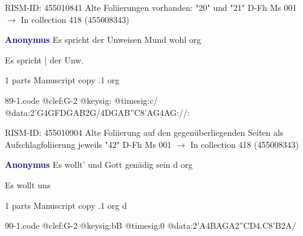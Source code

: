 \documentclass[twocolumn]{book}
\begin{document}
\newline RISM-ID: 455010841
\newline Alte Foliierungen vorhanden: "20" und "21"
\newline D-Fh  Ms 001
\newline $\rightarrow$ In collection 418 (455008343)

\newline \par \vspace{7pt} \textcolor{darkblue}{\textbf{Anonymus  }}
\newline Es spricht der Unweisen Mund wohl    
\newline org
\newline \begin{itshape}[f.43r, at left:] Es spricht | der Unw.\end{itshape} 
\newline \textcolor{darkblue}{}  1 parts  
\newline Manuscript copy
.1  org  
\begin{filecontents*}{89-1.code}
@clef:G-2
@keysig:
@timesig:c/
@data:2'G4GFDGAB2G/4DGAB''C{8'AG}4AG://:
\end{filecontents*}
\newline
%

\newline RISM-ID: 455010904
\newline Alte Foliierung auf den gegenüberliegenden Seiten als Aufschlagfoliierung jeweils "42"
\newline D-Fh  Ms 001
\newline $\rightarrow$ In collection 418 (455008343)

\newline \par \vspace{7pt} \textcolor{darkblue}{\textbf{Anonymus  }}
\newline Es wollt' und Gott genädig sein  d  
\newline org
\newline \begin{itshape}[f.27v, at left:] Es wollt uns\end{itshape} 
\newline \textcolor{darkblue}{}  1 parts  
\newline Manuscript copy
.1  org  d  
\begin{filecontents*}{90-1.code}
@clef:G-2
@keysig:bB
@timesig:0
@data:2'A4BAGA2''CD4.C8'B2A/
\end{filecontents*}
\newline
%
\end{document}
